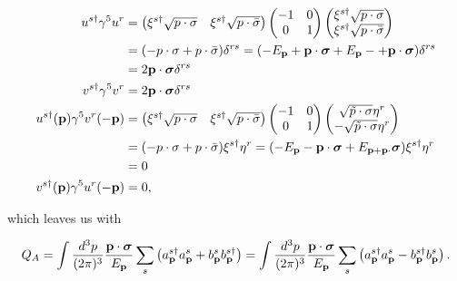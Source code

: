 \documentclass[11pt, a4paper]{amsart}
\begin{document}
\begin{align*}
u^{s\dagger} \gamma^5 u^r &= \begin{pmatrix}
\xi^{s\dagger} \sqrt{p\cdot \sigma} & \xi^{s\dagger} \sqrt{p\cdot \bar{\sigma}} 
\end{pmatrix}
\begin{pmatrix}
-1 & 0 \\
0 & 1
\end{pmatrix}
\begin{pmatrix}
\xi^{s\dagger} \sqrt{p\cdot \sigma} \\ \xi^{s\dagger} \sqrt{p\cdot \bar{\sigma}}
\end{pmatrix} \\
&= (-p\cdot\sigma + p\cdot \bar{\sigma}) \delta^{rs} = (-E_{\vb{p}} + \vb{p} \cdot \bm{\sigma} + E_{\vb{p}} -
+ \vb{p} \cdot \bm{\sigma}) \delta^{rs} \\
&= 2 \vb{p} \cdot \bm{\sigma}  \delta^{rs} \\
v^{s\dagger} \gamma^5 v^r & = 2 \vb{p} \cdot \bm{\sigma}  \delta^{rs} \\
u^{s\dagger}(\vb{p}) \gamma^5 v^r(-\vb{p}) &= \begin{pmatrix}
\xi^{s\dagger} \sqrt{p\cdot \sigma} & \xi^{s\dagger} \sqrt{p\cdot \bar{\sigma}} 
\end{pmatrix}
\begin{pmatrix}
-1 & 0 \\
0 & 1
\end{pmatrix}
\begin{pmatrix}
\sqrt{\tilde{p}\cdot\sigma} \eta^r \\
-\sqrt{\tilde{p}\cdot\sigma} \eta^r
\end{pmatrix} \\
&=(-p\cdot\sigma + p\cdot\bar{\sigma}) \xi^{s\dagger} \eta^r
= (-E_{\vb{p}} - \vb{p} \cdot \bm{\sigma} + E_{\vb{p} + \vb{p} \cdot} \bm{\sigma}) \xi^{s\dagger} \eta^r \\
&= 0 \\
v^{s\dagger}(\vb{p}) \gamma^5 u^r(-\vb{p}) &= 0,
\end{align*}

which leaves us with

\begin{equation}
Q_A = \int \frac{d^3p}{(2\pi)^3} \frac{\vb{p}\cdot \bm{\sigma}}{E_{\vb{p}}} \sum_s \left(a_{\vb{p}}^{s\dagger}a_{\vb{p}}^s + b_{\vb{p}}^s b_{\vb{p}}^{s\dagger} \right) = \int \frac{d^3p}{(2\pi)^3} \frac{\vb{p}\cdot \bm{\sigma}}{E_{\vb{p}}} \sum_s \left(a_{\vb{p}}^{s\dagger}a_{\vb{p}}^s - b_{\vb{p}}^{s\dagger} b_{\vb{p}}^{s} \right).
\end{equation}
\end{document}
